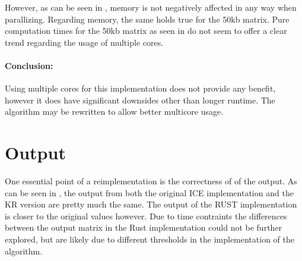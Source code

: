 


However, as can be seen in , memory is not negatively
affected in any way when parallizing. Regarding memory, the same holds true for
the 50kb matrix. Pure computation times for the 50kb matrix as seen in
 do not seem to offer a clear trend regarding the usage of
multiple cores.


\paragraph{Conclusion:} Using multiple cores for this implementation does not
provide any benefit, however it does have significant downsides other than
longer runtime. The algorithm may be rewritten to allow better multicore usage.



\section{Output}



One essential point of a reimplementation is the correctness of of the output.
As can be seen in , the output from both the original ICE
implementation and the KR version are pretty much the same. The output of the
RUST implementation is closer to the original values however. Due to time
contraints the differences between the output matrix in the Rust implementation
could not be further explored, but are likely due to different thresholds in
the implementation of the algorithm.






